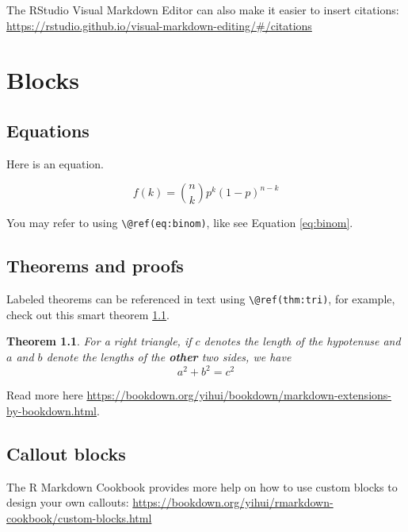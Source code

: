 \documentclass[
  12pt,
]{book}
\newtheorem{theorem}{Theorem}[chapter]
\theoremstyle{definition}
\theoremstyle{definition}
\theoremstyle{definition}
\theoremstyle{definition}
\theoremstyle{remark}
\begin{document}
The RStudio Visual Markdown Editor can also make it easier to insert citations: \url{https://rstudio.github.io/visual-markdown-editing/\#/citations}

\hypertarget{blocks}{%
\chapter{Blocks}\label{blocks}}

\hypertarget{equations}{%
\section{Equations}\label{equations}}

Here is an equation.

\begin{equation} 
  f\left(k\right) = \binom{n}{k} p^k\left(1-p\right)^{n-k}
  \label{eq:binom}
\end{equation}

You may refer to using \texttt{\textbackslash{}@ref(eq:binom)}, like see Equation \eqref{eq:binom}.

\hypertarget{theorems-and-proofs}{%
\section{Theorems and proofs}\label{theorems-and-proofs}}

Labeled theorems can be referenced in text using \texttt{\textbackslash{}@ref(thm:tri)}, for example, check out this smart theorem \ref{thm:tri}.

\begin{theorem}
\protect\hypertarget{thm:tri}{}\label{thm:tri}For a right triangle, if \(c\) denotes the \emph{length} of the hypotenuse
and \(a\) and \(b\) denote the lengths of the \textbf{other} two sides, we have
\[a^2 + b^2 = c^2\]
\end{theorem}

Read more here \url{https://bookdown.org/yihui/bookdown/markdown-extensions-by-bookdown.html}.

\hypertarget{callout-blocks}{%
\section{Callout blocks}\label{callout-blocks}}

The R Markdown Cookbook provides more help on how to use custom blocks to design your own callouts: \url{https://bookdown.org/yihui/rmarkdown-cookbook/custom-blocks.html}
\end{document}
